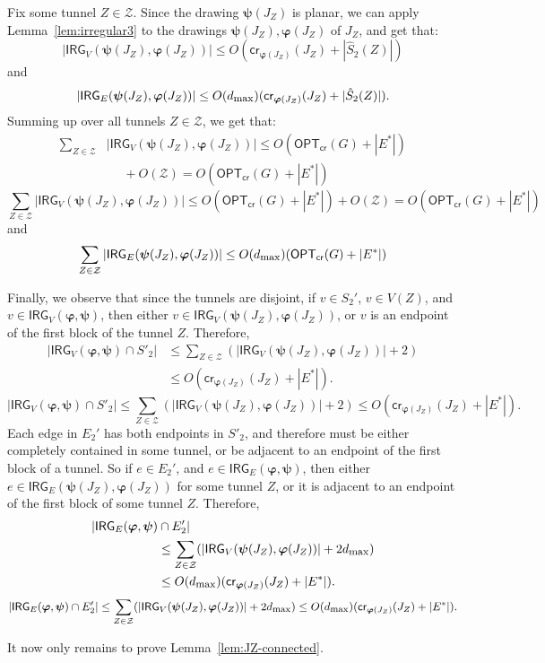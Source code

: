 \documentclass[twoside,leqno,twocolumn]{article}
\newcommand{\zset}{{\mathcal{Z}}}
\newcommand{\optcro}[1]{\mathsf{OPT}_{\mathsf{cr}}(#1)}
\newcommand{\cro}{\mathsf{cr}}
\newcommand{\irreg}{\mathsf{IRG}}
\newcommand{\dmax}{d_{\mbox{\textup{\footnotesize{max}}}}}
\newcommand{\bphi}{{\boldsymbol{\varphi}}}
\newcommand{\bpsi}{{\boldsymbol{\psi}}}
\begin{document}
Fix some tunnel $Z\in \zset$. Since the drawing $\bpsi(J_Z)$ is planar, we can apply
Lemma~\ref{lem:irregular3} to the drawings $\bpsi(J_Z),\bphi(J_Z)$ of $J_Z$, and get that:
\[|\irreg_V(\bpsi(J_Z),\bphi(J_Z))|\leq O(\cro_{\bphi(J_Z)}(J_Z)+|\hat{S}_2(Z)|)\]
and
\[|\irreg_E(\bpsi(J_Z),\bphi(J_Z))|\leq O(\dmax)(\cro_{\bphi(J_Z)}(J_Z)+|\hat{S}_2(Z)|).\]
Summing up over all tunnels $Z\in\zset$, we get that:
\ifabstract
\begin{align*}
\sum_{Z\in\zset} &|\irreg_V(\bpsi(J_Z),\bphi(J_Z))| \leq O(\optcro{G}+|E^*|)\\
&\phantom{{}\leq{}}{}+O(\zset) = O(\optcro{G}+|E^*|)
\end{align*}
\fi\iffull
$$
\sum_{Z\in\zset}|\irreg_V(\bpsi(J_Z),\bphi(J_Z))| \leq O(\optcro{G}+|E^*|)+O(\zset) = O(\optcro{G}+|E^*|)
$$
\fi
and
\[\sum_{Z\in\zset}|\irreg_E(\bpsi(J_Z),\bphi(J_Z))|\leq O(\dmax)(\optcro{G}+|E^*|)\]

Finally, we observe that since the tunnels are disjoint, if $v\in S_2'$, $v\in V(Z)$, and $v\in \irreg_V(\bphi,\bpsi)$, then either $v\in \irreg_V(\bpsi(J_Z),\bphi(J_Z))$, or $v$ is an endpoint of the first block of the tunnel $Z$. Therefore,
\ifabstract
\begin{align*}
|\irreg_V(\bphi,\bpsi)\cap S'_2| &\leq \sum_{Z\in\zset}(|\irreg_V(\bpsi(J_Z),\bphi(J_Z))|+2)\\
&\leq O(\cro_{\bphi(J_Z)}(J_Z)+|E^*|).
\end{align*}
\fi\iffull
$$
|\irreg_V(\bphi,\bpsi)\cap S'_2| \leq \sum_{Z\in\zset}(|\irreg_V(\bpsi(J_Z),\bphi(J_Z))|+2)
\leq O(\cro_{\bphi(J_Z)}(J_Z)+|E^*|).
$$
\fi
Each edge in $E_2'$ has both endpoints in $S'_2$, and therefore must be either completely contained in some tunnel, or be adjacent to an endpoint of the first block of a tunnel. So if $e\in E_2'$, and $e\in \irreg_E(\bphi,\bpsi)$, then either $e\in \irreg_E(\bpsi(J_Z),\bphi(J_Z))$ for some tunnel $Z$, or it is adjacent to an endpoint of the first block of some tunnel $Z$. Therefore,
\ifabstract
\begin{align*}
|\irreg_E (\bphi,\bpsi)&\cap E'_2| \\ &\leq \sum_{Z\in\zset}(|\irreg_V(\bpsi(J_Z),\bphi(J_Z))|+2\dmax)\\
&\leq O(\dmax)(\cro_{\bphi(J_Z)}(J_Z)+|E^*|).
\end{align*}
\fi\iffull
$$
|\irreg_E (\bphi,\bpsi) \cap E'_2| \leq \sum_{Z\in\zset}(|\irreg_V(\bpsi(J_Z),\bphi(J_Z))|+2\dmax) \leq O(\dmax)(\cro_{\bphi(J_Z)}(J_Z)+|E^*|).
$$
\fi

\iffull
It now only remains to prove Lemma~\ref{lem:JZ-connected}.
\fi
\end{document}
